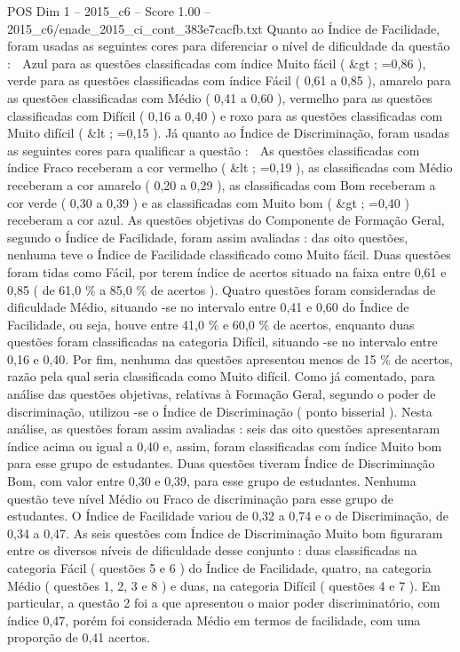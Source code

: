 \begin{textsample}{POS Dim 1 – 2015\_c6 – Score 1.00 – 2015\_c6/enade\_2015\_ci\_cont\_383e7cacfb.txt}
Quanto ao Índice de Facilidade, foram usadas as seguintes cores para diferenciar o nível de dificuldade da questão :  Azul para as questões classificadas com índice Muito fácil ( \&gt ; =0,86 ), verde para as questões classificadas com índice Fácil ( 0,61 a 0,85 ), amarelo para as questões classificadas com Médio ( 0,41 a 0,60 ), vermelho para as questões classificadas com Difícil ( 0,16 a 0,40 ) e roxo para as questões classificadas com Muito difícil ( \&lt ; =0,15 ).
Já quanto ao Índice de Discriminação, foram usadas as seguintes cores para qualificar a questão :  As questões classificadas com índice Fraco receberam a cor vermelho ( \&lt ; =0,19 ), as classificadas com Médio receberam a cor amarelo ( 0,20 a 0,29 ), as classificadas com Bom receberam a cor verde ( 0,30 a 0,39 ) e as classificadas com Muito bom ( \&gt ; =0,40 ) receberam a cor azul.
As questões objetivas do Componente de Formação Geral, segundo o Índice de Facilidade, foram assim avaliadas : das oito questões, nenhuma teve o Índice de Facilidade classificado como Muito fácil.
Duas questões foram tidas como Fácil, por terem índice de acertos situado na faixa entre 0,61 e 0,85 ( de 61,0 \% a 85,0 \% de acertos ).
Quatro questões foram consideradas de dificuldade Médio, situando -se no intervalo entre 0,41 e 0,60 do Índice de Facilidade, ou seja, houve entre 41,0 \% e 60,0 \% de acertos, enquanto duas questões foram classificadas na categoria Difícil, situando -se no intervalo entre 0,16 e 0,40.
Por fim, nenhuma das questões apresentou menos de 15 \% de acertos, razão pela qual seria classificada como Muito difícil.
Como já comentado, para análise das questões objetivas, relativas à Formação Geral, segundo o poder de discriminação, utilizou -se o Índice de Discriminação ( ponto bisserial ).
Nesta análise, as questões foram assim avaliadas : seis das oito questões apresentaram índice acima ou igual a 0,40 e, assim, foram classificadas com índice Muito bom para esse grupo de estudantes.
Duas questões tiveram Índice de Discriminação Bom, com valor entre 0,30 e 0,39, para esse grupo de estudantes.
Nenhuma questão teve nível Médio ou Fraco de discriminação para esse grupo de estudantes.
O Índice de Facilidade variou de 0,32 a 0,74 e o de Discriminação, de 0,34 a 0,47.
As seis questões com Índice de Discriminação Muito bom figuraram entre os diversos níveis de dificuldade desse conjunto : duas classificadas na categoria Fácil ( questões 5 e 6 ) do Índice de Facilidade, quatro, na categoria Médio ( questões 1, 2, 3 e 8 ) e duas, na categoria Difícil ( questões 4 e 7 ).
Em particular, a questão 2 foi a que apresentou o maior poder discriminatório, com índice 0,47, porém foi considerada Médio em termos de facilidade, com uma proporção de 0,41 acertos.

\end{textsample}
